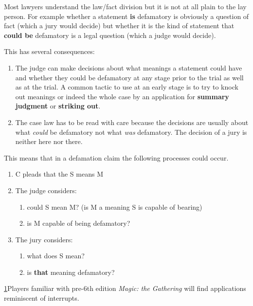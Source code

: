 \documentclass[]{article}
\begin{document}
{Most lawyers understand the law/fact division but it is not at all
plain to the lay person. For example whether a statement }\textbf{is}
{defamatory is obviously a question of fact (which a jury would decide)
but whether it is the kind of statement that }\textbf{could be}{
defamatory is a legal question (which a judge would decide).}

This has several consequences:

\begin{enumerate}
\item
  {The judge can make decisions about what meanings a statement could
  have and whether they could be defamatory at any stage prior to the
  trial as well as at the trial. A common tactic to use at an early
  stage is to try to knock out meanings or indeed the whole case by an
  application for }\textbf{summary judgment}{ or }\textbf{striking
  out}{.}
\item
  {The case law has to be read with care because the decisions are
  usually about what }\emph{{could}}{{ be defamatory not what
  }}\emph{{was}}{{ defamatory. The decision of a jury is neither here
  nor there.}}
\end{enumerate}

This means that in a defamation claim the following processes could
occur.

\begin{enumerate}
\item
  C pleads that the S means M
\item
  The judge considers:

  \begin{enumerate}
  \item
    could S mean M? (is M a meaning S is capable of bearing)
  \item
    is M capable of being defamatory?
  \end{enumerate}
\item
  The jury considers:

  \begin{enumerate}
  \item
    what does S mean?
  \item
    {is }\textbf{that}{ meaning defamatory?}
  \end{enumerate}
\end{enumerate}


\hyperref[sdfootnote1anc]{1}Players familiar with pre-6th edition
\emph{Magic: the Gathering} will find applications reminiscent of
interrupts.
\end{document}
